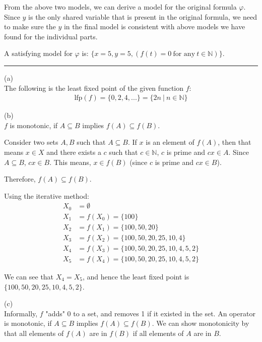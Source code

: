 \documentclass[12pt,letterpaper, onecolumn]{exam}
\begin{document}
\begin{questions}
	From the above two models, we can derive a model for the original formula $ \varphi $.
	Since $y$ is the only shared variable that is present in the original formula, we need to make sure the 
	$y$ in the final model is consistent with above models we have found for the individual parts.

	A satisfying model for $ \varphi $ is: $ \{x = 5, y = 5, (f(t) = 0 \: \text{for any} \: t \in \mathbb{N}) \} $.

    {\rule{17cm}{0.4pt}}

	\question[]
	\solutiontitle

	(a) \\
	The following is the least fixed point of the given function $f$:
	\begin{align*}
		\text{lfp}(f) = \{0, 2, 4, ...\} = \{2n \:|\: n \in \mathbb{N}\}
	\end{align*}

	(b) \\
	$f$ is monotonic, if $A \subseteq B$ implies $f(A) \subseteq f(B)$.

	Consider two sets $A, B$ such that $A \subseteq B$.
	If $x$ is an element of $f(A)$, then that means $x \in X$ and there exists a $c$ such that $c \in \mathbb{N}$, $c$ is prime and $cx \in A$.
	Since $A \subseteq B$, $cx \in B$.
	This means, $x \in f(B)$ (since $c$ is prime and $cx \in B$).

	Therefore, $f(A) \subseteq f(B)$.

	Using the iterative method:
	\begin{align*}
		X_0 &= \emptyset \\
		X_1 &= f(X_0) = \{100\} \\
		X_2 &= f(X_1) = \{ 100, 50, 20 \} \\
		X_3 &= f(X_2) = \{ 100, 50, 20, 25, 10, 4 \} \\
		X_4 &= f(X_3) = \{ 100, 50, 20, 25, 10, 4, 5, 2 \} \\
		X_5 &= f(X_4) = \{ 100, 50, 20, 25, 10, 4, 5, 2 \} 
	\end{align*}

	We can see that $X_4 = X_5$, and hence the least fixed point is $ \{100, 50, 20, 25, 10, 4, 5, 2\} $.

	(c) \\
	Informally, $f$ "adds" 0 to a set, and removes 1 if it existed in the set.
	An operator is monotonic, if $A \subseteq B$ implies $f(A) \subseteq f(B)$.
	We can show monotonicity by that all elements of $f(A)$ are in $f(B)$ if all elements of $A$ are in $B$.


\end{questions}
\end{document}
